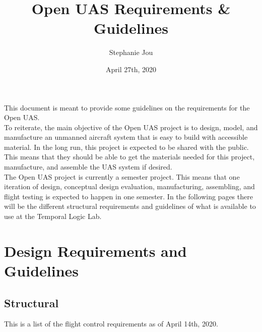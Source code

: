 \documentclass{article}
\title{Open UAS Requirements \& Guidelines}
\date{April 27th, 2020}
\author{Stephanie Jou}
\begin{document}
\onehalfspacing
\maketitle
\newpage

\justify
\tableofcontents
\newpage

This document is meant to provide some guidelines on the requirements for the Open UAS. \\

To reiterate, the main objective of the Open UAS project is to design, model, and manufacture an unmanned aircraft system that is easy to build with accessible material. In the long run, this project is expected to be shared with the public. This means that they should be able to get the materials needed for this project, manufacture, and assemble the UAS system if desired. \\

The Open UAS project is currently a semester project. This means that one iteration of design, conceptual design evaluation, manufacturing, assembling, and flight testing is expected to happen in one semester. In the following pages there will be the different structural requirements and guidelines of what is available to use at the Temporal Logic Lab.\\

\section{Design Requirements and Guidelines}
\subsection{Structural}
This is a list of the flight control requirements as of April 14th, 2020.
\end{document}
